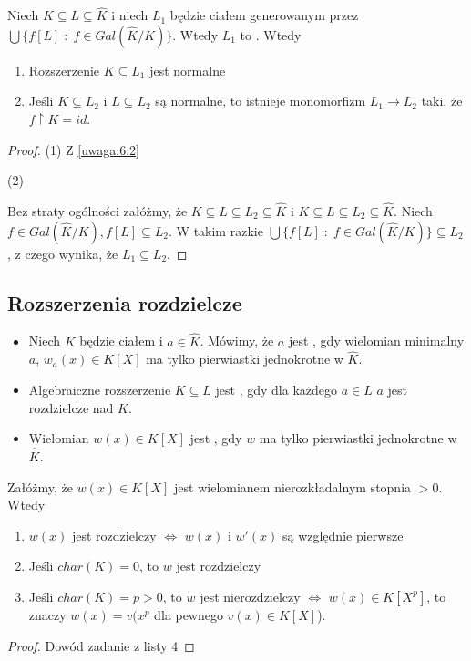 \begin{remark}
    Niech $K\subseteq L\subseteq \hat{K}$ i niech $L_1$ będzie ciałem generowanym przez $\bigcup\{f[L]\;:\;f\in Gal(\hat{K}/K)\}$. Wtedy $L_1$ to . Wtedy
    \begin{enumerate}
        \item Rozszerzenie $K\subseteq L_1$ jest normalne
        \item Jeśli $K\subseteq L_2$ i $L\subseteq L_2$ są normalne, to istnieje monomorfizm $L_1\to L_2$ taki, że $f\restriction K=id$.
    \end{enumerate}
\end{remark}
\begin{proof}
    (1) Z \ref{uwaga:6:2}

    (2)

    Bez straty ogólności załóżmy, że $K\subseteq L\subseteq L_2\subseteq\hat{K}$ i $K\subseteq L\subseteq L_2\subseteq\hat{K}$. Niech $f\in Gal(\hat{K}/K),f[L]\subseteq L_2$. W takim razkie $\bigcup\{f[L]\;:\;f\in Gal(\hat{K}/K)\}\subseteq L_2$, z czego wynika, że $L_1\subseteq L_2$.
\end{proof}

\subsection{Rozszerzenia rozdzielcze}

\begin{bbox}
\begin{itemize}[leftmargin=*]
    \item Niech $K$ będzie ciałem i $a\in \hat{K}$. Mówimy, że $a$ jest , gdy wielomian minimalny $a$, $w_a(x)\in K[X]$ ma tylko pierwiastki jednokrotne w $\hat{K}$.
    \item Algebraiczne rozszerzenie $K\subseteq L$ jest , gdy dla każdego $a\in L$ $a$ jest rozdzielcze nad $K$.
    \item Wielomian $w(x)\in K[X]$ jest , gdy $w$ ma tylko pierwiastki jednokrotne w $\hat{K}$.
\end{itemize}
\end{bbox}

\begin{remark}
Załóżmy, że $w(x)\in K[X]$ jest wielomianem nierozkładalnym stopnia $>0$. Wtedy
\begin{enumerate}
    \item $w(x)$ jest rozdzielczy $\iff$ $w(x)$ i $w'(x)$ są względnie pierwsze
    \item Jeśli $char(K)=0$, to $w$ jest rozdzielczy
    \item Jeśli $char(K)=p>0$, to $w$ jest nierozdzielczy $\iff$ $w(x)\in K[X^p]$, to znaczy $w(x)=v(x^p$ dla pewnego $v(x)\in K[X]$).
\end{enumerate}
\end{remark}
\begin{proof}
    Dowód zadanie  z listy 4
\end{proof}

